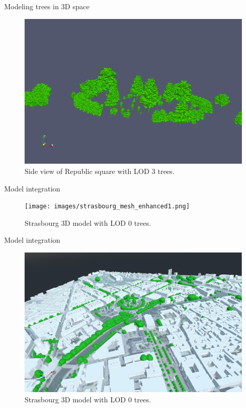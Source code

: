 \documentclass[10pt]{beamer}
\begin{document}
\begin{frame}{Modeling trees in 3D space}
  \begin{figure}[H]
    \centering
    \includegraphics[width=1\textwidth]{images/republic_lod3_side.png}
    \caption{Side view of Republic square with LOD 3 trees.}
\end{figure}
\end{frame}

\begin{frame}{Model integration}
  \begin{figure}[H]
    \centering
    \texttt{[image: images/strasbourg\_mesh\_enhanced1.png]}
    \caption{Strasbourg 3D model with LOD 0 trees.}
\end{figure}
\end{frame}

\begin{frame}{Model integration}
  \begin{figure}[H]
    \centering
    \includegraphics[width=1\textwidth]{images/strasbourg_mesh_enhanced2.png}
    \caption{Strasbourg 3D model with LOD 0 trees.}
\end{figure}
\end{frame}
\end{document}
